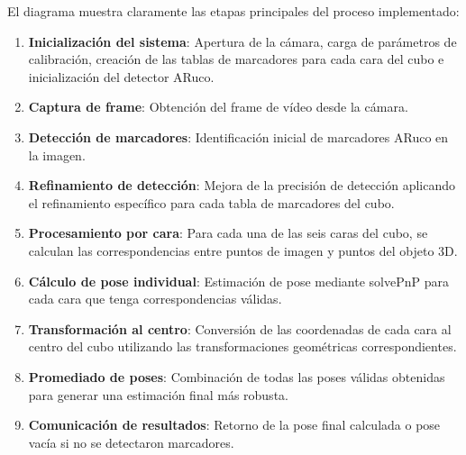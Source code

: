 El diagrama muestra claramente las etapas principales del proceso implementado:
\begin{enumerate}
    \item \textbf{Inicialización del sistema}: Apertura de la cámara, carga de parámetros de calibración, creación de las tablas de marcadores para cada cara del cubo e inicialización del detector ARuco.
    \item \textbf{Captura de frame}: Obtención del frame de vídeo desde la cámara.
    \item \textbf{Detección de marcadores}: Identificación inicial de marcadores ARuco en la imagen.
    \item \textbf{Refinamiento de detección}: Mejora de la precisión de detección aplicando el refinamiento específico para cada tabla de marcadores del cubo.
    \item \textbf{Procesamiento por cara}: Para cada una de las seis caras del cubo, se calculan las correspondencias entre puntos de imagen y puntos del objeto 3D.
    \item \textbf{Cálculo de pose individual}: Estimación de pose mediante solvePnP para cada cara que tenga correspondencias válidas.
    \item \textbf{Transformación al centro}: Conversión de las coordenadas de cada cara al centro del cubo utilizando las transformaciones geométricas correspondientes.
    \item \textbf{Promediado de poses}: Combinación de todas las poses válidas obtenidas para generar una estimación final más robusta.
    \item \textbf{Comunicación de resultados}: Retorno de la pose final calculada o pose vacía si no se detectaron marcadores.
\end{enumerate}

